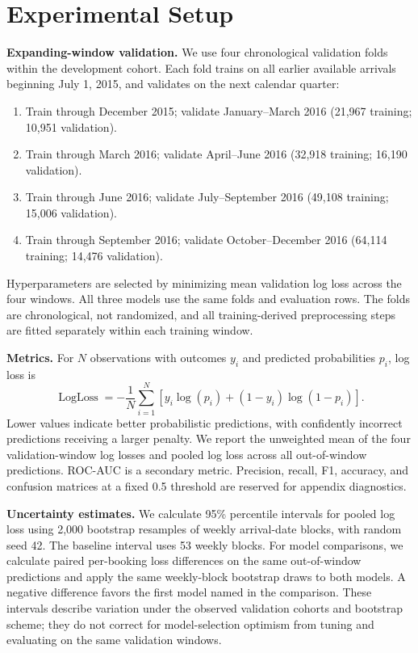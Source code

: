 \documentclass{article}
\begin{document}
\section{Experimental Setup}

\textbf{Expanding-window validation.}
We use four chronological validation folds within the development
cohort. Each fold trains on all earlier available arrivals beginning
July 1, 2015, and validates on the next calendar quarter:

\begin{enumerate}
    \item Train through December 2015; validate January--March 2016
    (21,967 training; 10,951 validation).
    \item Train through March 2016; validate April--June 2016
    (32,918 training; 16,190 validation).
    \item Train through June 2016; validate July--September 2016
    (49,108 training; 15,006 validation).
    \item Train through September 2016; validate October--December 2016
    (64,114 training; 14,476 validation).
\end{enumerate}

Hyperparameters are selected by minimizing mean validation log loss
across the four windows. All three models use the same folds and
evaluation rows. The folds are chronological, not randomized, and
all training-derived preprocessing steps are fitted separately
within each training window.

\textbf{Metrics.}
For $N$ observations with outcomes $y_i$ and predicted probabilities
$p_i$, log loss is
\[
\operatorname{LogLoss}
=
-\frac{1}{N}\sum_{i=1}^{N}
\left[
y_i\log(p_i)+(1-y_i)\log(1-p_i)
\right].
\]
Lower values indicate better probabilistic predictions, with
confidently incorrect predictions receiving a larger penalty.
We report the unweighted mean of the four validation-window
log losses and pooled log loss across all out-of-window predictions.
ROC-AUC is a secondary metric. Precision, recall, F1, accuracy,
and confusion matrices at a fixed 0.5 threshold are reserved for
appendix diagnostics.

\textbf{Uncertainty estimates.}
We calculate 95\% percentile intervals for pooled log loss using
2,000 bootstrap resamples of weekly arrival-date blocks, with random
seed 42. The baseline interval uses 53 weekly blocks. For model
comparisons, we calculate paired per-booking loss differences on
the same out-of-window predictions and apply the same weekly-block
bootstrap draws to both models. A negative difference favors the
first model named in the comparison. These intervals describe
variation under the observed validation cohorts and bootstrap
scheme; they do not correct for model-selection optimism from
tuning and evaluating on the same validation windows.
\end{document}
